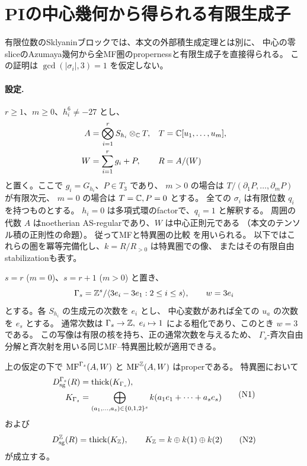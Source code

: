 \section{PIの中心幾何から得られる有限生成子}
\label{sec:notes-pi-residue-generator}

有限位数のSklyaninブロックでは、本文の外部積生成定理とは別に、
中心の零sliceのAzumaya幾何から全MF圏のpropernessと有限生成子を直接得られる。
この証明は \(\gcd(|\sigma_i|,3)=1\) を仮定しない。

\paragraph{設定.}
\(r\ge1\)、\(m\ge0\)、\(h_i^6\ne-27\) とし、
\[
 \begin{aligned}
 A&=\bigotimes_{i=1}^rS_{h_i}\otimes_\mathbb C T,
 &T&=\mathbb C[u_1,\ldots,u_m],\\
 W&=\sum_{i=1}^r g_i+P,
 &R&=A/(W)
 \end{aligned}
\]
と置く。ここで \(g_i=G_{h_i}\)、\(P\in T_3\) であり、
\(m>0\) の場合は \(T/(\partial_1P,\ldots,\partial_mP)\) が有限次元、
\(m=0\) の場合は \(T=\mathbb C,P=0\) とする。
全ての \(\sigma_i\) は有限位数 \(q_i\) を持つものとする。
\(h_i=0\) は多項式環のfactorで、\(q_i=1\) と解釈する。
周囲の代数 \(A\) はnoetherian AS-regularであり、\(W\) は中心正則元である
（本文のテンソル積の正則性の命題）。
従ってMFと特異圏の比較 \cite[Theorem 5.8]{CCKM} を用いられる。
以下ではこれらの圏を冪等完備化し、\(k=R/R_{>0}\) は特異圏での像、
またはその有限自由stabilizationも表す。

\(s=r\) (\(m=0\))、\(s=r+1\) (\(m>0\)) と置き、
\[
 \Gamma_s=\mathbb Z^s/\langle3e_i-3e_1:2\le i\le s\rangle,
 \qquad w=3e_i
\]
とする。各 \(S_{h_i}\) の生成元の次数を \(e_i\) とし、
中心変数があれば全ての \(u_a\) の次数を \(e_s\) とする。
通常次数は \(\Gamma_s\to\ZZ,\ e_i\mapsto1\) による粗化であり、このとき \(w=3\) である。
この写像は有限の核を持ち、正の通常次数を与えるため、
\(\Gamma_s\)-斉次自由分解と斉次射を用いる同じMF--特異圏比較が適用できる。

\begin{proposition}[PIの場合のpropernessと残余体生成]
\label{prop:notes-pi-residue-generator}
上の仮定の下で \(\operatorname{MF}^{\Gamma_s}(A,W)\) と \(\operatorname{MF}^\mathbb Z(A,W)\) はproperである。
特異圏において
\[
 \begin{aligned}
 D_{\mathrm{sg}}^{\Gamma_s}(R)&=\operatorname{thick}(K_{\Gamma_s}),\\
 K_{\Gamma_s}&=
 \bigoplus_{(a_1,\ldots,a_s)\in\{0,1,2\}^s}
 k(a_1e_1+\cdots+a_se_s)
 \end{aligned}
 \tag{N1}\label{eq:notes-pi-gamma-generator}
\]
および
\[
 D_{\mathrm{sg}}^\mathbb Z(R)=\operatorname{thick}(K_{\mathbb Z}),\qquad
 K_{\mathbb Z}=k\oplus k(1)\oplus k(2)
 \tag{N2}\label{eq:notes-pi-z-generator}
\]
が成立する。
\end{proposition}

